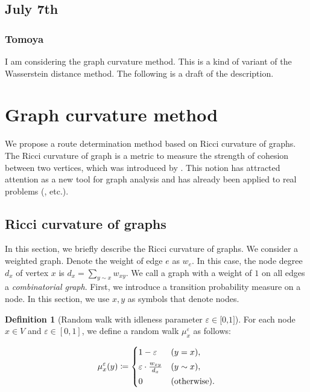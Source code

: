 \documentclass{article}
\numberwithin{equation}{section}
\theoremstyle{definition}
\newtheorem{definition}{Definition}[section]
\newcommand{\dis}{\displaystyle}
\newcommand{\eps}{\varepsilon} %
\newcommand{\rwx}{\mu_x^\eps} %
\def\:={\coloneqq} %
\begin{document}
\subsection{July 7th}

\subsubsection*{Tomoya}
 
I am considering the graph curvature method.
This is a kind of variant of the Wasserstein distance method.
The following is a draft of the description.

\section*{Graph curvature method}
We propose a route determination method based on Ricci curvature of graphs.
The Ricci curvature of graph is a metric to measure the strength of cohesion between two vertices, which was introduced by \cite{Ol,LLY}.
This notion has attracted attention as a new tool for graph analysis and has already been applied to real problems (\cite{JL,NLGGS,NLLG}, etc.).

\subsection*{Ricci curvature of graphs} \label{intro of Ricci}
In this section, we briefly describe the Ricci curvature of graphs.
We consider a weighted graph.
Denote the weight of edge $e$ as $w_e$.
In this case, the node degree $d_x$ of vertex $x$ is $d_x=\sum_{y\sim x}w_{xy}$.
We call a graph with a weight of $1$ on all edges a \emph{combinatorial graph}.
First, we introduce a transition probability measure on a node.
In this section, we use $x,y$ as symbols that denote nodes.

\begin{definition}[Random walk with idleness parameter $\eps\in\text{[0,1]}$] \label{random walk}
For each node $x\in V$ and $\eps\in[0,1]$, we define a random walk $\rwx$ as follows: \vspace{-3mm}
\begin{center}
\[ \dis \rwx(y) \:=
\begin{cases}
1-\eps & (y=x) , \vspace{1mm} \\
\eps\cdot\frac{w_{xy}}{d_x} & (y\sim x) , \vspace{1mm} \\
0 & (\text{otherwise}) .
\end{cases}\]
\end{center} 
\end{definition}
\end{document}
